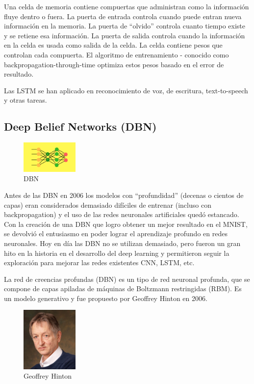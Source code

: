 \documentclass[a4paper]{article}
\begin{document}
Una celda de memoria contiene compuertas que administran como la 
información fluye dentro o fuera. La puerta de entrada controla 
cuando puede entran nueva información en la memoria. La puerta de 
“olvido” controla cuanto tiempo existe y se retiene esa 
información. La puerta de salida controla cuando la información en 
la celda es usada como salida de la celda. La celda contiene pesos 
que controlan cada compuerta. El algoritmo de entrenamiento -
conocido como backpropagation-through-time optimiza estos pesos 
basado en el error de resultado.

Las LSTM se han aplicado en reconocimiento de voz, de escritura, 
text-to-speech y otras tareas.


\subsection{Deep Belief Networks (DBN)}
\begin{figure} %
    \centering
    \includegraphics[width=0.25\textwidth]{./images/deep_belief.png}
    \caption{DBN}
\end{figure}

Antes de las DBN en 2006 los modelos con “profundidad” (decenas o 
cientos de capas) eran considerados demasiado difíciles de 
entrenar (incluso con backpropagation) y el uso de las redes 
neuronales artificiales quedó estancado. Con la creación de una 
DBN que logro obtener un mejor resultado en el MNIST, se devolvió 
el entusiasmo en poder lograr el aprendizaje profundo en redes 
neuronales. Hoy en día las DBN no se utilizan demasiado, pero 
fueron un gran hito en la historia en el desarrollo del deep 
learning y permitieron seguir la exploración para mejorar las 
redes existentes CNN, LSTM, etc.

La red de creencias profundas (DBN) es un tipo de red neuronal 
profunda, que se compone de capas apiladas de máquinas de 
Boltzmann restringidas (RBM). Es un modelo generativo y fue 
propuesto por Geoffrey Hinton en 2006.
\\
\begin{figure} %
    \centering
    \includegraphics[width=0.25\textwidth]{./images/Geoffrey_Hinton.jpeg}
    \caption{Geoffrey Hinton}
\end{figure}
\end{document}
